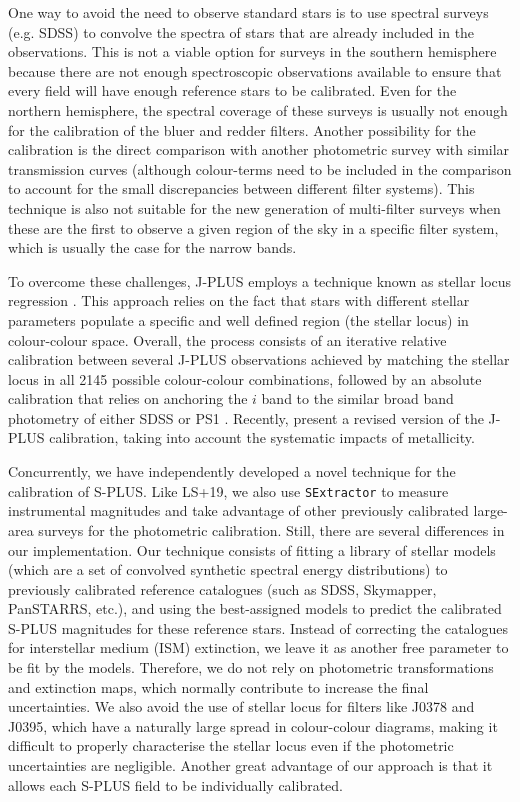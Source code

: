 \documentclass[fleqn,usenatbib]{mnras}
\begin{document}
One way to avoid the need to observe standard stars is to use spectral surveys (e.g. SDSS) to convolve the spectra of stars that are already included in the observations. This is not a viable option for surveys in the southern hemisphere because there are not enough spectroscopic observations available to ensure that every field will have enough reference stars to be calibrated. Even for the northern hemisphere, the spectral coverage of these surveys is usually not enough for the calibration of the bluer and redder filters. Another possibility for the calibration is the direct comparison with another photometric survey with similar transmission curves (although colour-terms need to be included in the comparison to account for the small discrepancies between different filter systems). This technique is also not suitable for the new generation of multi-filter surveys when these are the first to observe a given region of the sky in a specific filter system, which is usually the case for the narrow bands.

To overcome these challenges, J-PLUS employs a technique known as stellar locus regression \citep{Covey+2007, High+2019, Kelly+2014}. This approach relies on the fact that stars with different stellar parameters populate a specific and well defined region (the stellar locus) in colour-colour space. Overall, the process consists of an iterative relative calibration between several J-PLUS observations achieved by matching the stellar locus in all 2145 possible colour-colour combinations, followed by an absolute calibration that relies on anchoring the $i$ band to the similar broad band photometry of either SDSS or PS1 \citep[][hereafter, LS+19]{LopesSanjuan+2019}. Recently, \citep{LopezSanjuan+2021} present a revised version of the J-PLUS calibration, taking into account the systematic impacts of metallicity.

Concurrently, we have independently developed a novel technique for the calibration of S-PLUS. Like LS+19, we also use \texttt{SExtractor} \citep{Bertin+Arnouts1996} to measure instrumental magnitudes and take advantage of other previously calibrated large-area surveys for the photometric calibration. Still, there are several differences in our implementation. Our technique consists of fitting a library of stellar models (which are a set of convolved synthetic spectral energy distributions) to previously calibrated reference catalogues (such as SDSS, Skymapper, PanSTARRS, etc.), and using the best-assigned models to predict the calibrated S-PLUS magnitudes for these reference stars. Instead of correcting the catalogues for interstellar medium (ISM) extinction, we leave it as another free parameter to be fit by the models. Therefore, we do not rely on photometric transformations and extinction maps, which normally contribute to increase the final uncertainties. We also avoid the use of stellar locus for filters like J0378 and J0395, which have a naturally large spread in colour-colour diagrams, making it difficult to properly characterise the stellar locus even if the photometric uncertainties are negligible. Another great advantage of our approach is that it allows each S-PLUS field to be individually calibrated.
\end{document}
